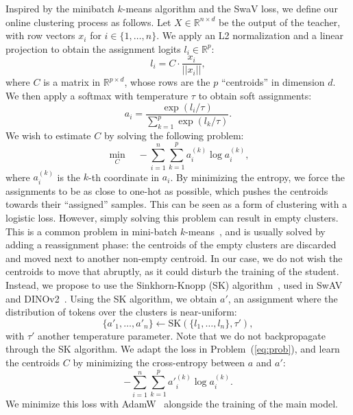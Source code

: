 Inspired by the minibatch $k$-means algorithm and the SwaV loss, we define our online clustering process as follows.
Let $X \in \mathbb{R}^{n \times d}$ be the output of the teacher, with row vectors $x_i$ for $i\in\{1,\ldots,n\}$.
We apply an L2 normalization and a linear projection to obtain the assignment logits $l_i \in \mathbb{R}^p$:
\begin{equation}
l_i = C \cdot \frac{x_i}{||x_i||},
\end{equation}
where $C$ is a matrix in $\mathbb{R}^{p\times d}$, whose rows are the $p$ ``centroids'' in dimension $d$.
We then apply a softmax with temperature $\tau$ to obtain soft assignments:
\begin{equation}
a_i = \frac{\exp(l_i/\tau)}{\sum_{k=1}^p{\exp(l_k/\tau)}}.
\end{equation}
We wish to estimate $C$ by solving the following problem:
\begin{equation}
    \min_{C} \quad -\sum_{i=1}^n \sum_{k=1}^p a_i^{(k)} \log a_i^{(k)},
    \label{eq:prob}
\end{equation}
where $a_i^{(k)}$ is the $k$-th coordinate in $a_i$.
By minimizing the entropy, we force the assignments to be as close to one-hot as possible, which pushes the centroids towards their ``assigned'' samples.
This can be seen as a form of clustering with a logistic loss.
However, simply solving this problem can result in empty clusters.
This is a common problem in mini-batch $k$-means~\citep{minibatchkmeans}, and is usually solved by adding a reassignment phase:
the centroids of the empty clusters are discarded and moved next to another non-empty centroid.
In our case, we do not wish the centroids to move that abruptly, as it could disturb the training of the student.
Instead, we propose to use the Sinkhorn-Knopp (SK) algorithm~\citep{sinkhorn1967concerning}, used in SwAV~\citep{swav} and DINOv2~\citep{dinov2}.
Using the SK algorithm, we obtain $a'$, an assignment where the distribution of tokens over the clusters is near-uniform:
\begin{equation}
\label{eq:sk}
    \{a'_1, \dots, a'_n\} \leftarrow \text{SK}(\{l_1, \dots, l_n\}, \tau'),
\end{equation}
with $\tau'$ another temperature parameter.
Note that we do not backpropagate through the SK algorithm.
We adapt the loss in Problem~(\ref{eq:prob}), and learn the centroids $C$ by minimizing the cross-entropy between $a$ and $a'$:
\begin{equation}
 - \sum_{i=1}^n \sum_{k=1}^p {a'}_{i}^{(k)} \log a_{i}^{(k)}.
\end{equation}
We minimize this loss with AdamW~\citep{adamw} alongside the training of the main model.



